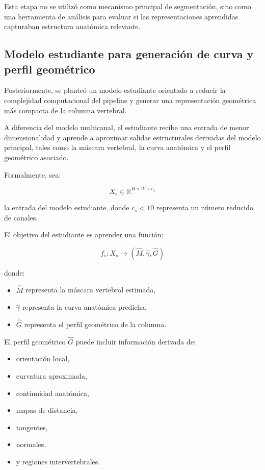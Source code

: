 \documentclass[conference]{IEEEtran}
\begin{document}
Esta etapa no se utilizó como mecanismo principal de segmentación, sino como una herramienta de análisis para evaluar si las representaciones aprendidas capturaban estructura anatómica relevante.

\subsection{Modelo estudiante para generación de curva y perfil geométrico}

Posteriormente, se planteó un modelo estudiante orientado a reducir la complejidad computacional del pipeline y generar una representación geométrica más compacta de la columna vertebral.

A diferencia del modelo multicanal, el estudiante recibe una entrada de menor dimensionalidad y aprende a aproximar salidas estructurales derivadas del modelo principal, tales como la máscara vertebral, la curva anatómica y el perfil geométrico asociado.

Formalmente, sea:

\[
X_s \in \mathbb{R}^{H \times W \times c_s}
\]

la entrada del modelo estudiante, donde \(c_s < 10\) representa un número reducido de canales.

El objetivo del estudiante es aprender una función:

\[
f_s:X_s \rightarrow (\hat{M}, \hat{\gamma}, \hat{G})
\]

donde:

\begin{itemize}
    \item \(\hat{M}\) representa la máscara vertebral estimada,
    \item \(\hat{\gamma}\) representa la curva anatómica predicha,
    \item \(\hat{G}\) representa el perfil geométrico de la columna.
\end{itemize}

El perfil geométrico \(\hat{G}\) puede incluir información derivada de:

\begin{itemize}
    \item orientación local,
    \item curvatura aproximada,
    \item continuidad anatómica,
    \item mapas de distancia,
    \item tangentes,
    \item normales,
    \item y regiones intervertebrales.
\end{itemize}
\end{document}
